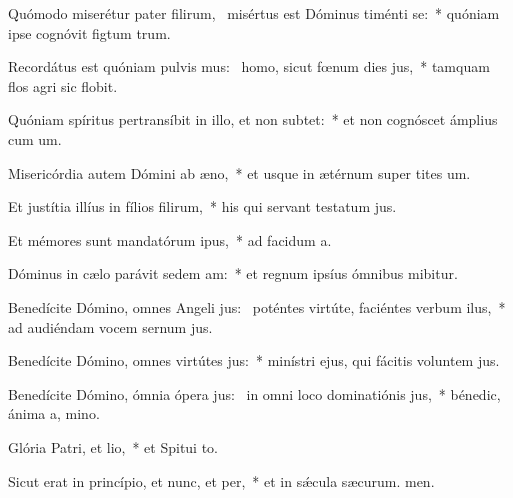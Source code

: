 \item Quómodo miserétur pater filirum,~\pscross{} misértus est Dóminus timénti se:~* quóniam ipse cognóvit figtum trum.
\item Recordátus est quóniam pulvis mus:~\pscross{} homo, sicut fœnum dies jus,~* tamquam flos agri sic flobit.
\item Quóniam spíritus pertransíbit in illo, et non subtet:~* et non cognóscet ámplius cum um.
\item Misericórdia autem Dómini ab æno,~* et usque in ætérnum super tites um.
\item Et justítia illíus in fílios filirum,~* his qui servant testatum jus.
\item Et mémores sunt mandatórum ipus,~* ad facidum a.
\item Dóminus in cælo parávit sedem am:~* et regnum ipsíus ómnibus mibitur.
\item Benedícite Dómino, omnes Angeli jus:~\pscross{} poténtes virtúte, faciéntes verbum ilus,~* ad audiéndam vocem sernum jus.
\item Benedícite Dómino, omnes virtútes jus:~* minístri ejus, qui fácitis voluntem jus.
\item Benedícite Dómino, ómnia ópera jus:~\pscross{} in omni loco dominatiónis jus,~* bénedic, ánima a, mino.
\item Glória Patri, et lio,~* et Spitui to.
\item Sicut erat in princípio, et nunc, et per,~* et in sǽcula sæcurum. men.
